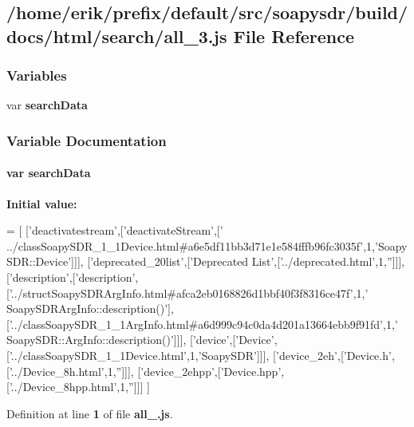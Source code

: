 \subsection{/home/erik/prefix/default/src/soapysdr/build/docs/html/search/all\+\_\+3.js File Reference}
\label{all__3_8js}
\subsubsection*{Variables}
\begin{DoxyCompactItemize}
\item 
var {\bf search\+Data}
\end{DoxyCompactItemize}


\subsubsection{Variable Documentation}
\paragraph[{search\+Data}]{\setlength{\rightskip}{0pt plus 5cm}var search\+Data}\label{all__3_8js_ad01a7523f103d6242ef9b0451861231e}
{\bfseries Initial value\+:}
\begin{DoxyCode}
=
[
  [\textcolor{stringliteral}{'deactivatestream'},[\textcolor{stringliteral}{'deactivateStream'},[\textcolor{stringliteral}{'
      ../classSoapySDR\_1\_1Device.html#a6e5df11bb3d71e1e584fffb96fc3035f'},1,\textcolor{stringliteral}{'SoapySDR::Device'}]]],
  [\textcolor{stringliteral}{'deprecated\_20list'},[\textcolor{stringliteral}{'Deprecated List'},[\textcolor{stringliteral}{'../deprecated.html'},1,\textcolor{stringliteral}{''}]]],
  [\textcolor{stringliteral}{'description'},[\textcolor{stringliteral}{'description'},[\textcolor{stringliteral}{'../structSoapySDRArgInfo.html#afca2eb0168826d1bbf40f3f8316ce47f'},1,\textcolor{stringliteral}{'
      SoapySDRArgInfo::description()'}],[\textcolor{stringliteral}{'../classSoapySDR\_1\_1ArgInfo.html#a6d999c94c0da4d201a13664ebb9f91fd'},1,\textcolor{stringliteral}{'
      SoapySDR::ArgInfo::description()'}]]],
  [\textcolor{stringliteral}{'device'},[\textcolor{stringliteral}{'Device'},[\textcolor{stringliteral}{'../classSoapySDR\_1\_1Device.html'},1,\textcolor{stringliteral}{'SoapySDR'}]]],
  [\textcolor{stringliteral}{'device\_2eh'},[\textcolor{stringliteral}{'Device.h'},[\textcolor{stringliteral}{'../Device\_8h.html'},1,\textcolor{stringliteral}{''}]]],
  [\textcolor{stringliteral}{'device\_2ehpp'},[\textcolor{stringliteral}{'Device.hpp'},[\textcolor{stringliteral}{'../Device\_8hpp.html'},1,\textcolor{stringliteral}{''}]]]
]
\end{DoxyCode}


Definition at line {\bf 1} of file {\bf all\+\_.\+js}.

